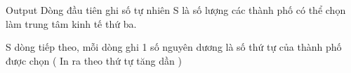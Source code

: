 Output
Dòng đầu tiên ghi số tự nhiên S là số lượng các thành phố có thể chọn làm trung tâm kinh tế thứ ba.  

   S dòng tiếp theo, mỗi dòng ghi 1 số nguyên dương là số thứ tự của thành phố được chọn ( In ra theo thứ tự tăng dần )